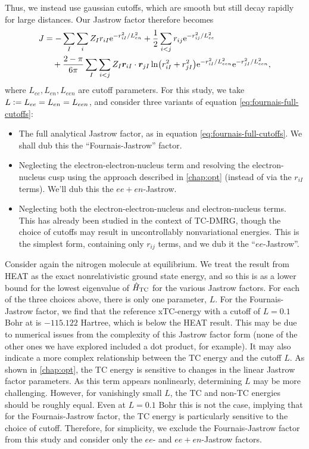 Thus, we instead use gaussian cutoffs, which are smooth but still decay rapidly for large distances. Our Jastrow factor therefore becomes %
\begin{align}
    \label{eq:fournais-full-cutoffs}
    J &= -\sum_I\sum_i Z_Ir_{iI}\mathrm{e}^{-r_{iI}^2/L_{en}^2} + \frac 12\sum_{i<j}r_{ij}\mathrm{e}^{-r_{ij}^2/L_{ee}^2} \nonumber \\
    &\quad + \frac{2-\pi}{6\pi}\sum_I\sum_{i<j}Z_I\bm r_{iI}\cdot \bm r_{jI}\ln(r_{iI}^2+r_{jI}^2)\mathrm{e}^{-r_{iI}^2/L_{een}^2}\mathrm{e}^{-r_{jI}^2/L_{een}^2},
\end{align}
where $L_{ee}, L_{en}, L_{een}$ are cutoff parameters. For this study, we take $L\mathrel{\mathop:}= L_{ee} = L_{en} = L_{een}$, and consider three variants of equation \ref{eq:fournais-full-cutoffs}:
\begin{itemize}
    \item The full analytical Jastrow factor, as in equation \ref{eq:fournais-full-cutoffs}. We shall dub this the ``Fournais-Jastrow'' factor.
    \item Neglecting the electron-electron-nucleus term and resolving the electron-nucleus cusp using the approach described in \autoref{chap:opt} (instead of via the $r_{iI}$ terms). We'll dub this the $ee+en$-Jastrow.
    \item Neglecting both the electron-electron-nucleus and electron-nucleus terms. This has already been studied in the context of TC-DMRG,\supercite{szenesStriking2024} though the choice of cutoffs may result in uncontrollably nonvariational energies. This is the simplest form, containing only $r_{ij}$ terms, and we dub it the ``$ee$-Jastrow''.
\end{itemize}

Consider again the nitrogen molecule at equilibrium. We treat the result from \gls{HEAT}\supercite{fellerSurvey2008} as the exact nonrelativistic ground state energy, and so this is as a lower bound for the lowest eigenvalue of $\hat H_\mathrm{TC}$ for the various Jastrow factors. For each of the three choices above, there is only one parameter, $L$. For the Fournais-Jastrow factor, we find that the reference xTC-energy with a cutoff of $L=0.1$ Bohr at \avtz is $-115.122$ Hartree, which is below the HEAT result. This may be due to numerical issues from the complexity of this Jastrow factor form (none of the other ones we have explored included a dot product, for example). It may also indicate a more complex relationship between the TC energy and the cutoff $L$. As shown in \autoref{chap:opt}, the TC energy is sensitive to changes in the linear Jastrow factor parameters. As this term appears nonlinearly, determining $L$ may be more challenging. However, for vanishingly small $L$, the TC and non-TC energies should be roughly equal. Even at $L=0.1$ Bohr this is not the case, implying that for the Fournais-Jastrow factor, the TC energy is particularly sensitive to the choice of cutoff. Therefore, for simplicity, we exclude the Fournais-Jastrow factor from this study and consider only the $ee$- and $ee+en$-Jastrow factors.

